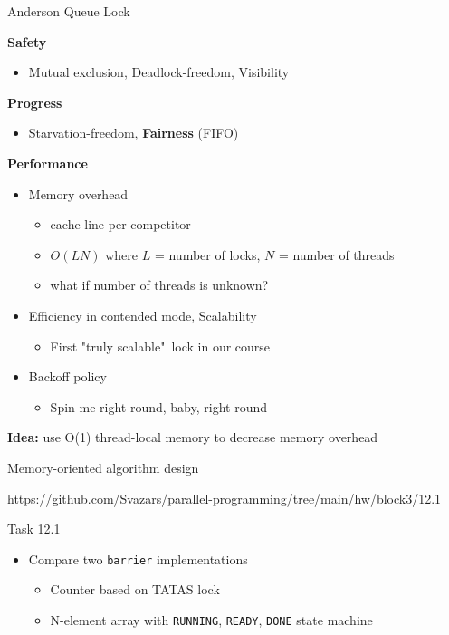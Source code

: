 \begin{frame}{Anderson Queue Lock}

\textbf{Safety}
\begin{itemize}
  \item Mutual exclusion, Deadlock-freedom, Visibility
\end{itemize}

\textbf{Progress}
\begin{itemize}
  \item Starvation-freedom, \textbf{Fairness} (FIFO)
\end{itemize}

\textbf{Performance}
\begin{itemize}
  \item Memory overhead
  \begin{itemize}    
    \item cache line per competitor
    \item $O(LN)$ where $L$ = number of locks, $N$ = number of threads
    \item what if number of threads is unknown?   
  \end{itemize}
  \item Efficiency in contended mode, Scalability
  \begin{itemize}
    \item First "truly scalable"\ lock in our course
  \end{itemize}  
  \item Backoff policy  
  \begin{itemize}
    \item Spin me right round, baby, right round
  \end{itemize}  
\end{itemize}

\pause
\textbf{Idea:} use O(1) thread-local memory to decrease memory overhead

\end{frame}


\begin{frame}[t]{Memory-oriented algorithm design}

{\small\url{https://github.com/Svazars/parallel-programming/tree/main/hw/block3/12.1}}
\begin{homeworkmail}{Task 12.1}
    \begin{itemize}      
      \item Compare two \texttt{barrier} implementations
      \begin{itemize}      
          \item Counter based on TATAS lock
          \item N-element array with \texttt{RUNNING}, \texttt{READY}, \texttt{DONE} state machine
      \end{itemize}      
    \end{itemize}
\end{homeworkmail}
\end{frame}

